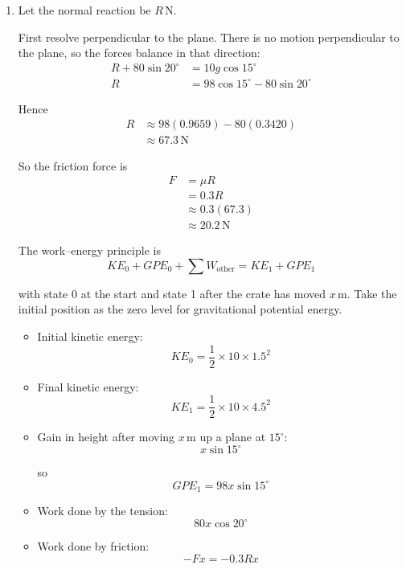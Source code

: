 \documentclass[leqno]{article}
\begin{document}
\begin{enumerate}[
  label=\textbf{\arabic*.},
  leftmargin=*,
  topsep=0pt,
  partopsep=0pt,
  parsep=0pt
]
\vspace*{10pt}

\begin{djsSolution}
\begin{enumerate}[label=\textbf{(\alph*)}]
  \item Let the normal reaction be $R\,\mathrm{N}$.

  First resolve perpendicular to the plane. There is no motion perpendicular to the plane, so the forces balance in that direction:
  \begin{align*}
  R + 80\sin 20^\circ &= 10g\cos 15^\circ \\
  R &= 98\cos 15^\circ - 80\sin 20^\circ
  \end{align*}

  Hence
  \begin{align*}
  R &\approx 98(0.9659) - 80(0.3420) \\
    &\approx 67.3\,\mathrm{N}
  \end{align*}

  So the friction force is
  \begin{align*}
  F &= \mu R \\
    &= 0.3R \\
    &\approx 0.3(67.3) \\
    &\approx 20.2\,\mathrm{N}
  \end{align*}

  The work--energy principle is
  \[
  KE_0+GPE_0+\sum W_{\text{other}}=KE_1+GPE_1
  \]

  with state 0 at the start and state 1 after the crate has moved \(x\,\mathrm{m}\). Take the initial position as the zero level for gravitational potential energy.

  \begin{itemize}
    \item Initial kinetic energy:
    \[
    KE_0=\frac12 \times 10 \times 1.5^2
    \]
    \item Final kinetic energy:
    \[
    KE_1=\frac12 \times 10 \times 4.5^2
    \]
    \item Gain in height after moving $x\,\mathrm{m}$ up a plane at $15^\circ$:
    \[
    x\sin 15^\circ
    \]

    so
    \[
    GPE_1=98x\sin 15^\circ
    \]
    \item Work done by the tension:
    \[
    80x\cos 20^\circ
    \]
    \item Work done by friction:
    \[
    -Fx=-0.3Rx
    \]
  \end{itemize}


\end{enumerate}
\end{djsSolution}
\end{enumerate}
\end{document}
